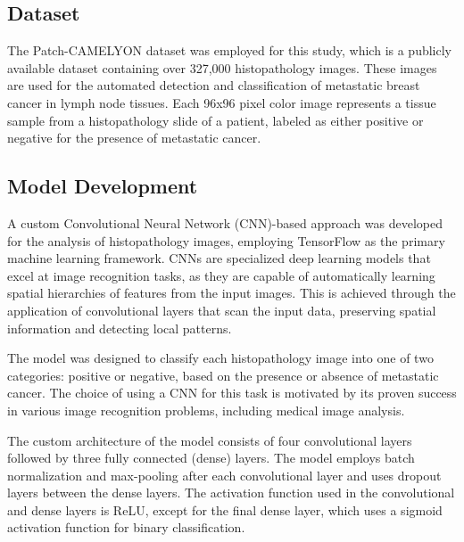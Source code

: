 \subsection{Dataset}
The Patch-CAMELYON dataset was employed for this study, which is a publicly available dataset containing over 327,000 histopathology images. These images are used for the automated detection and classification of metastatic breast cancer in lymph node tissues. Each 96x96 pixel color image represents a tissue sample from a histopathology slide of a patient, labeled as either positive or negative for the presence of metastatic cancer.

\subsection{Model Development}
A custom Convolutional Neural Network (CNN)-based approach was developed for the analysis of histopathology images, employing TensorFlow as the primary machine learning framework. CNNs are specialized deep learning models that excel at image recognition tasks, as they are capable of automatically learning spatial hierarchies of features from the input images. This is achieved through the application of convolutional layers that scan the input data, preserving spatial information and detecting local patterns.

The model was designed to classify each histopathology image into one of two categories: positive or negative, based on the presence or absence of metastatic cancer. The choice of using a CNN for this task is motivated by its proven success in various image recognition problems, including medical image analysis.

The custom architecture of the model consists of four convolutional layers followed by three fully connected (dense) layers. The model employs batch normalization and max-pooling after each convolutional layer and uses dropout layers between the dense layers. The activation function used in the convolutional and dense layers is ReLU, except for the final dense layer, which uses a sigmoid activation function for binary classification.



